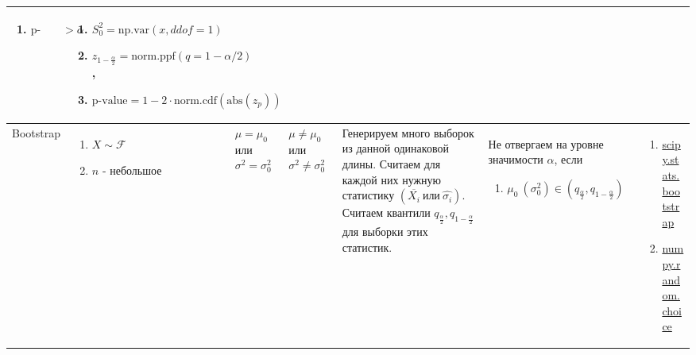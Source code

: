 \documentclass[14pt, a1paper, fleqn]{extarticle}
\begin{document}
\begin{center}
\begin{tabular}{|p{6cm}|p{8cm}|p{3cm}|p{3cm}|p{9cm}|p{10cm}|p{14cm}|}
\begin{enumerate}
                \item \( \text{p-value} > \alpha \)
            \end{enumerate} 
            & \begin{enumerate}
                \item \( S_0^2 = \text{np.var}(x, ddof=1) \)
                \item \( z_{1-\frac{\alpha}{2}} = \text{norm.ppf}(q=1 - \alpha/2) \),
                \item \( \text{p-value} = 1 - 2 \cdot \text{norm.cdf}(\text{abs}(z_p)) \)
            \end{enumerate} \\
            \hline
            Bootstrap
            & \begin{enumerate}
             \item \( X \sim \mathcal{F} \)
             \item \( n \) - небольшое
            \end{enumerate} 
            & \(  \mu = \mu_0 \) \newline 
            или \newline
             \( \sigma^2 = \sigma^2_0 \)
            & \(  \mu \neq \mu_0 \) \newline или \newline \( \sigma^2 \neq \sigma^2_0 \)
            & Генерируем много выборок из данной одинаковой длины. Считаем для каждой них нужную статистику \( \left( \overline{X_i} ~ \text{или} ~ \hat{\sigma_i} \right) \). Считаем квантили \( q_{\frac{\alpha}{2}}, q_{1-\frac{\alpha}{2}} \) для выборки этих статистик.
            & Не отвергаем на уровне значимости \( \alpha \), если 
            \begin{enumerate}
                \item \( 
                    \mu_0 ~ (\sigma^2_0) \in \left( q_{\frac{\alpha}{2}}, q_{1-\frac{\alpha}{2}} \right) \)
            \end{enumerate} 
            & \begin{enumerate}
                \item \href{https://docs.scipy.org/doc/scipy/reference/generated/scipy.stats.bootstrap.html}{scipy.stats.bootstrap}
                \item \href{https://numpy.org/doc/stable/reference/random/generated/numpy.random.choice.html}{numpy.random.choice}
            \end{enumerate} \\
            \hline
        \end{tabular}
    \end{center}
\end{document}
